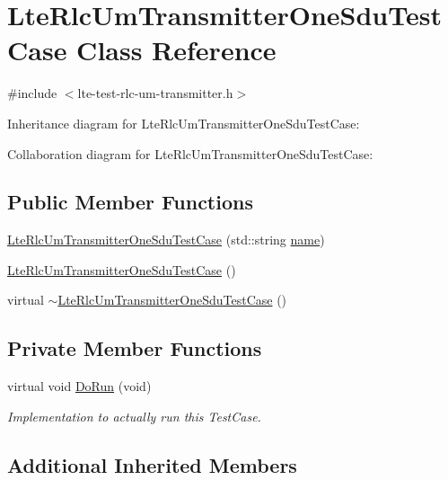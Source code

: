 \hypertarget{classLteRlcUmTransmitterOneSduTestCase}{}\section{Lte\+Rlc\+Um\+Transmitter\+One\+Sdu\+Test\+Case Class Reference}
\label{classLteRlcUmTransmitterOneSduTestCase}


{\ttfamily \#include $<$lte-\/test-\/rlc-\/um-\/transmitter.\+h$>$}



Inheritance diagram for Lte\+Rlc\+Um\+Transmitter\+One\+Sdu\+Test\+Case\+:


Collaboration diagram for Lte\+Rlc\+Um\+Transmitter\+One\+Sdu\+Test\+Case\+:
\subsection*{Public Member Functions}
\begin{DoxyCompactItemize}
\item 
\hyperlink{classLteRlcUmTransmitterOneSduTestCase_a3e628e8aff0c6d8fe81a5f4f23317246}{Lte\+Rlc\+Um\+Transmitter\+One\+Sdu\+Test\+Case} (std\+::string \hyperlink{generate__test__data__lte__spectrum__model_8m_ab74e6bf80237ddc4109968cedc58c151}{name})
\item 
\hyperlink{classLteRlcUmTransmitterOneSduTestCase_a2e617f5968d38c5c9f3379965b123a86}{Lte\+Rlc\+Um\+Transmitter\+One\+Sdu\+Test\+Case} ()
\item 
virtual \hyperlink{classLteRlcUmTransmitterOneSduTestCase_a9c521d881f63b96e6a6a11155eadd078}{$\sim$\+Lte\+Rlc\+Um\+Transmitter\+One\+Sdu\+Test\+Case} ()
\end{DoxyCompactItemize}
\subsection*{Private Member Functions}
\begin{DoxyCompactItemize}
\item 
virtual void \hyperlink{classLteRlcUmTransmitterOneSduTestCase_a5dfb3cf0c75d90b24a0e9b2be3d1bccf}{Do\+Run} (void)
\begin{DoxyCompactList}\small\item\em Implementation to actually run this Test\+Case. \end{DoxyCompactList}\end{DoxyCompactItemize}
\subsection*{Additional Inherited Members}



